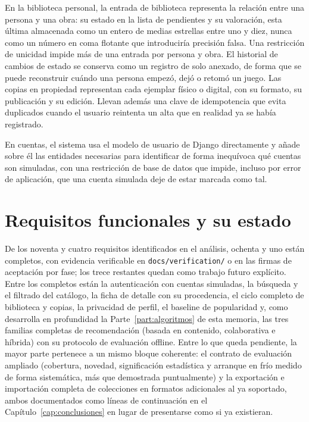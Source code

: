 En la biblioteca personal, la entrada de biblioteca representa la relación entre una persona y
una obra: su estado en la lista de pendientes y su valoración, esta última almacenada como un
entero de medias estrellas entre uno y diez, nunca como un número en coma flotante que
introduciría precisión falsa. Una restricción de unicidad impide más de una entrada por
persona y obra. El historial de cambios de estado se conserva como un registro de solo
anexado, de forma que se puede reconstruir cuándo una persona empezó, dejó o retomó un juego.
Las copias en propiedad representan cada ejemplar físico o digital, con su formato, su
publicación y su edición. Llevan además una clave de idempotencia que evita duplicados cuando
el usuario reintenta un alta que en realidad ya se había registrado.

En cuentas, el sistema usa el modelo de usuario de Django directamente y añade sobre él las
entidades necesarias para identificar de forma inequívoca qué cuentas son simuladas, con una
restricción de base de datos que impide, incluso por error de aplicación, que una cuenta
simulada deje de estar marcada como tal.

\section{Requisitos funcionales y su estado}\label{sec:req-funcionales}

De los noventa y cuatro requisitos identificados en el análisis, ochenta y uno están
completos, con evidencia verificable en \texttt{docs/verification/} o en las firmas de
aceptación por fase; los trece restantes quedan como trabajo futuro explícito. Entre los completos están
la autenticación con cuentas simuladas, la búsqueda y el filtrado del catálogo, la ficha de
detalle con su procedencia, el ciclo completo de biblioteca y copias, la privacidad de perfil,
el baseline de popularidad y, como desarrolla en profundidad la
Parte~\ref{part:algoritmos} de esta memoria, las tres familias completas de recomendación
(basada en contenido, colaborativa e híbrida) con su protocolo de evaluación offline. Entre lo
que queda pendiente, la mayor parte pertenece a un mismo bloque coherente: el contrato de
evaluación ampliado (cobertura, novedad, significación estadística y arranque en frío medido de
forma sistemática, más que demostrada puntualmente) y la exportación e importación completa de
colecciones en formatos adicionales al ya soportado, ambos documentados como líneas de
continuación en el Capítulo~\ref{cap:conclusiones} en lugar de presentarse como si ya
existieran.

